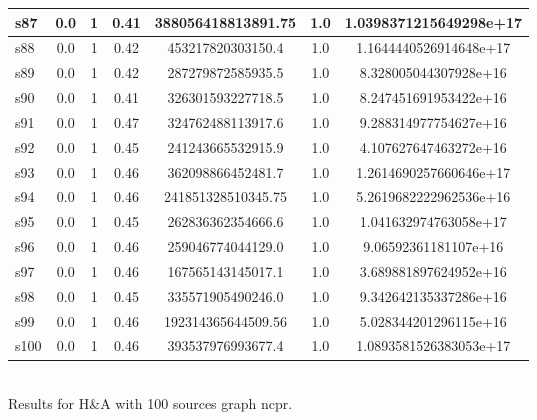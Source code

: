 \documentclass{article}
\begin{document}
\begin{tabular}{|l|c|c|c|c|c|c|}
\hline
s87 &0.0 & 1 & 0.41 & 388056418813891.75 & 1.0 & 1.0398371215649298e+17\\
\hline
s88 &0.0 & 1 & 0.42 & 453217820303150.4 & 1.0 & 1.1644440526914648e+17\\
\hline
s89 &0.0 & 1 & 0.42 & 287279872585935.5 & 1.0 & 8.328005044307928e+16\\
\hline
s90 &0.0 & 1 & 0.41 & 326301593227718.5 & 1.0 & 8.247451691953422e+16\\
\hline
s91 &0.0 & 1 & 0.47 & 324762488113917.6 & 1.0 & 9.288314977754627e+16\\
\hline
s92 &0.0 & 1 & 0.45 & 241243665532915.9 & 1.0 & 4.107627647463272e+16\\
\hline
s93 &0.0 & 1 & 0.46 & 362098866452481.7 & 1.0 & 1.2614690257660646e+17\\
\hline
s94 &0.0 & 1 & 0.46 & 241851328510345.75 & 1.0 & 5.2619682222962536e+16\\
\hline
s95 &0.0 & 1 & 0.45 & 262836362354666.6 & 1.0 & 1.041632974763058e+17\\
\hline
s96 &0.0 & 1 & 0.46 & 259046774044129.0 & 1.0 & 9.06592361181107e+16\\
\hline
s97 &0.0 & 1 & 0.46 & 167565143145017.1 & 1.0 & 3.689881897624952e+16\\
\hline
s98 &0.0 & 1 & 0.45 & 335571905490246.0 & 1.0 & 9.342642135337286e+16\\
\hline
s99 &0.0 & 1 & 0.46 & 192314365644509.56 & 1.0 & 5.028344201296115e+16\\
\hline
s100 &0.0 & 1 & 0.46 & 393537976993677.4 & 1.0 & 1.0893581526383053e+17\\
\hline
\end{tabular}\\

\noindent Results for H\&A with 100 sources graph ncpr.
\end{document}
